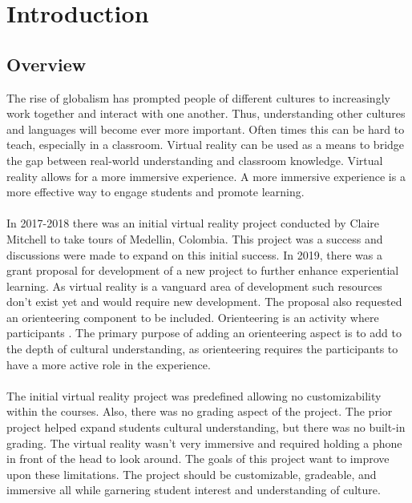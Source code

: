 \section{Introduction}
\label{sec:Introduction}

\subsection{Overview} 
The rise of globalism has prompted people of different cultures to increasingly work together and interact with one another. Thus, understanding other cultures and languages will become ever more important. Often times this can be hard to teach, especially in a classroom. Virtual reality can be used as a means to bridge the gap between real-world understanding and classroom knowledge. Virtual reality allows for a more immersive experience. A more immersive experience is a more effective way to engage students and promote learning. \\
\\
In 2017-2018 there was an initial virtual reality project conducted by Claire Mitchell to take tours of Medellin, Colombia. This project was a success and discussions were made to expand on this initial success. In 2019, there was a grant proposal for development of a new project to further enhance experiential learning. As virtual reality is a vanguard area of development such resources don't exist yet and would require new development. The proposal also requested an orienteering component to be included. Orienteering is an activity where participants . The primary purpose of adding an orienteering aspect is to add to the depth of cultural understanding, as orienteering requires the participants to have a more active role in the experience. \\
\\
The initial virtual reality project was predefined allowing no customizability within the courses. Also, there was no grading aspect of the project. The prior project helped expand students cultural understanding, but there was no built-in grading. The virtual reality wasn't very immersive and required holding a phone in front of the head to look around. The goals of this project want to improve upon these limitations. The project should be customizable, gradeable, and immersive all while garnering student interest and understanding of culture.  
